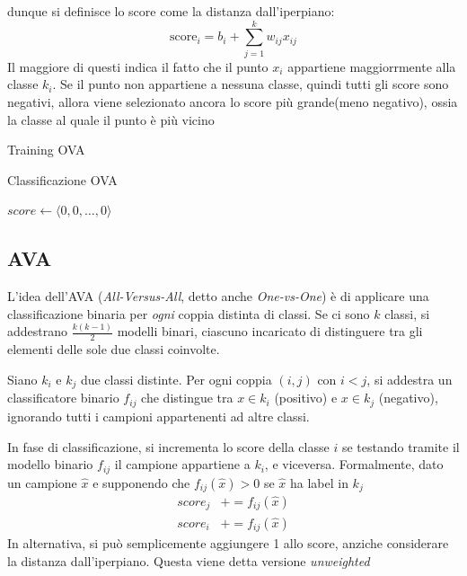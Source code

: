 dunque si definisce lo score come la distanza dall'iperpiano:
\[
	\text{score}_i = b_i + \sum_{j=1}^{k} w_{ij} x_{ij}
\]
Il maggiore di questi indica il fatto che il punto $ x_i $ appartiene maggiorrmente alla classe $ k_i $. Se il punto non appartiene a nessuna classe, quindi tutti gli score sono negativi, allora viene selezionato ancora lo score più grande(meno negativo), ossia la classe al quale il punto è più vicino

\begin{algoritmo}{Training OVA}
	\begin{algorithm}[H]
		\vskip3mm
	\end{algorithm}
\end{algoritmo}

\begin{algoritmo}{Classificazione OVA}
	\begin{algorithm}[H]
		\vskip3mm
		$score \gets \langle 0, 0, \dots, 0 \rangle$ 
	\end{algorithm}
\end{algoritmo}

\subsection{AVA}
L’idea dell’AVA (\textit{All-Versus-All}, detto anche \textit{One-vs-One}) è di applicare una classificazione binaria per \emph{ogni} coppia distinta di classi. Se ci sono $k$ classi, si addestrano $\frac{k(k-1)}{2}$ modelli binari, ciascuno incaricato di distinguere tra gli elementi delle sole due classi coinvolte.

Siano $k_i$ e $k_j$ due classi distinte. Per ogni coppia $(i, j)$ con $i < j$, si addestra un classificatore binario $f_{ij}$ che distingue tra $x \in k_i$ (positivo) e $x \in k_j$ (negativo), ignorando tutti i campioni appartenenti ad altre classi.

In fase di classificazione, si incrementa lo score della classe $ i $ se testando tramite il modello binario $ f_{ij} $ il campione appartiene a $ k_i $, e viceversa. Formalmente, dato un campione $ \hat{x} $ e supponendo che $ f_{ij}\left(\hat{x}\right)>0 $ se $ \hat{x} $ ha label in $ k_j $
\begin{align*}
	score_j & += f_{ij}\left(\hat{x}\right) \\
	score_i & += f_{ij}\left(\hat{x}\right)
\end{align*}
In alternativa, si può semplicemente aggiungere 1 allo score, anziche considerare la distanza dall'iperpiano. Questa viene detta versione \textit{unweighted}

